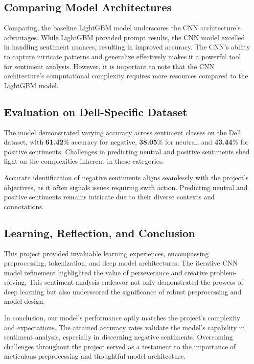 \subsection{Comparing Model Architectures}
\vspace{-1em}
Comparing, the baseline LightGBM model underscores the CNN architecture's advantages. While LightGBM provided prompt results, the CNN model excelled in handling sentiment nuances, resulting in improved accuracy. The CNN's ability to capture intricate patterns and generalize effectively makes it a powerful tool for sentiment analysis. However, it is important to note that the CNN architecture's computational complexity requires more resources compared to the LightGBM model.
\vspace{-1em}
\subsection{Evaluation on Dell-Specific Dataset}
\vspace{-1em}
The model demonstrated varying accuracy across sentiment classes on the Dell dataset, with \textbf{61.42}\% accuracy for negative, \textbf{38.05}\% for neutral, and \textbf{43.44}\% for positive sentiments. Challenges in predicting neutral and positive sentiments shed light on the complexities inherent in these categories.

Accurate identification of negative sentiments aligns seamlessly with the project's objectives, as it often signals issues requiring swift action. Predicting neutral and positive sentiments remains intricate due to their diverse contexts and connotations.
\vspace{-1em}
\subsection{Learning, Reflection, and Conclusion}
\vspace{-1em}
This project provided invaluable learning experiences, encompassing preprocessing, tokenization, and deep model architectures. The iterative CNN model refinement highlighted the value of perseverance and creative problem-solving. This sentiment analysis endeavor not only demonstrated the prowess of deep learning but also underscored the significance of robust preprocessing and model design.

In conclusion, our model's performance aptly matches the project's complexity and expectations. The attained accuracy rates validate the model's capability in sentiment analysis, especially in discerning negative sentiments. Overcoming challenges throughout the project served as a testament to the importance of meticulous preprocessing and thoughtful model architecture.
\vspace{-1em}
